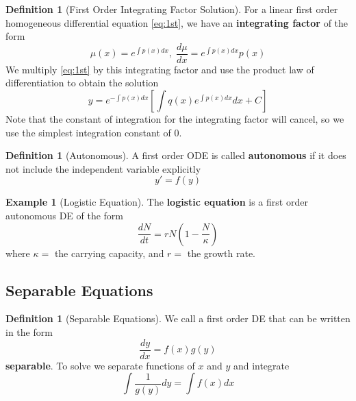\documentclass[12pt]{article}
\theoremstyle{definition}
\newtheorem{defn}[thm]{Definition}
\newtheorem{eg}[thm]{Example}
\theoremstyle{remark}
\numberwithin{equation}{section}
\newcommand\B[1]{\textbf{ #1}}
\begin{document}
\begin{defn}[First Order Integrating Factor Solution]
        For a linear first order homogeneous differential equation \ref{eq:1st}, we have an \B{integrating factor} of the form \begin{equation}
                \mu(x) = e^{\int p(x)dx},\;\frac{d\mu}{dx} = e^{\int p(x)dx}p(x)
        \end{equation}
        We multiply \ref{eq:1st} by this integrating factor and use the product law of differentiation to obtain the solution
        \begin{equation}
                y = e^{-\int p(x) dx}\left[\int q(x)e^{\int p(x)dx}dx + C \right]
        \end{equation}
        Note that the constant of integration for the integrating factor will cancel, so we use the simplest integration constant of 0.
\end{defn}



\vspace{1cm}


\begin{defn}[Autonomous]
        A first order ODE is called \B{autonomous} if it does not include the independent variable explicitly \begin{equation}
                y' = f(y)
        \end{equation}
\end{defn}


\vspace{1cm}


\begin{eg}[Logistic Equation]
        The \B{logistic equation} is a first order autonomous DE of the form \begin{equation}
                \frac{dN}{dt} = rN\left(1 - \frac{N}{\kappa}\right)
        \end{equation}
        where $\kappa = $ the carrying capacity, and $r = $ the growth rate.
\end{eg}




\vspace{1cm}

\subsection{Separable Equations}

\begin{defn}[Separable Equations]
        We call a first order DE that can be written in the form \begin{equation}
                \frac{dy}{dx}=f(x)g(y)
        \end{equation}
        \B{separable}. To solve we separate functions of $x$ and $y$ and integrate \begin{equation}
                \int\frac{1}{g(y)}dy = \int f(x)dx
        \end{equation}
\end{defn}
\end{document}
